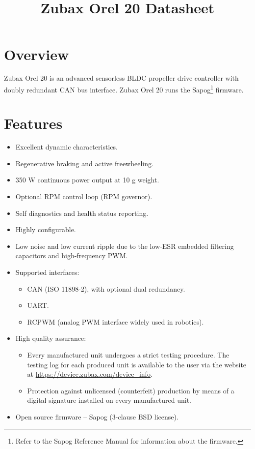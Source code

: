 \documentclass{zubaxdoc}
\title{Zubax Orel 20 Datasheet}
\begin{document}
\frontmatter

\begin{titlepage}

\section*{Overview}

Zubax Orel 20 is an advanced sensorless BLDC propeller drive controller with doubly redundant CAN bus interface.
Zubax Orel 20 runs the Sapog\footnote{Refer to the Sapog Reference Manual for information about the firmware.}
firmware.

\section*{Features}

\begin{itemize}
    \item Excellent dynamic characteristics.
    \item Regenerative braking and active freewheeling.
    \item 350 W continuous power output at 10 g weight.
    \item Optional RPM control loop (RPM governor).
    \item Self diagnostics and health status reporting.
    \item Highly configurable.
    \item Low noise and low current ripple due to the low-\allowbreak{}ESR embedded filtering capacitors and
    high-\allowbreak{}frequency PWM.
    \item Supported interfaces:
    \begin{itemize}
        \item CAN (ISO 11898-2), with optional dual redundancy.
        \item UART.
        \item RCPWM (analog PWM interface widely used in robotics).
    \end{itemize}
    \item High quality assurance:
    \begin{itemize}
        \item Every manufactured unit undergoes a strict testing procedure.
        The testing log for each produced unit is available to the user via the website at
        \url{https://device.zubax.com/device_info}.
        \item Protection against unlicensed (counterfeit) production by means of a digital signature
        installed on every manufactured unit.
    \end{itemize}
    \item Open source firmware -- Sapog (3-clause BSD license).
\end{itemize}


\end{titlepage}
\end{document}
